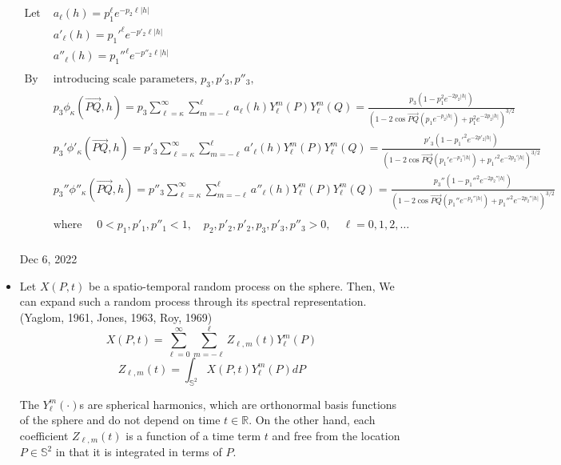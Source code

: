 \documentclass[11pt]{article}
\begin{document}
\begin{itemize}
\pagebreak

\begin{align*}
\text{Let } &a_\ell(h) = p_1^\ell e^{-p_2 \ell |h|}\\
&a'_\ell(h) = p_1'^{\ell} e^{-p'_2 \ell |h|}\\  
&a''_\ell(h) = p_1''^\ell e^{-p''_2 \ell |h|}\\
\\
\text{By } &\text{introducing scale parameters, } p_3, p'_3, p''_3,\\
& p_3 \phi_\kappa(\overrightarrow{PQ},h) = p_3 \sum_{\ell=\kappa}^{\infty} \sum_{m=-\ell}^{\ell}  a_{\ell}(h) Y_{\ell}^{m}(P) Y_{\ell}^{m}(Q) = \frac{p_3(1-p_1^2 e^{-2p_2|h|})}{(1-2 \cos{\overrightarrow{PQ}} (p_1e^{-p_2|h|}) + p_1^2 e^{-2p_2|h|})^{3/2}}\\
& p_3' \phi'_\kappa(\overrightarrow{PQ},h) = p'_3 \sum_{\ell=\kappa}^{\infty} \sum_{m=-\ell}^{\ell}  a'_{\ell}(h) Y_{\ell}^{m}(P) Y_{\ell}^{m}(Q) = \frac{{p'}_3(1-p_1'^2 e^{-2p'_2|h|})}{(1-2 \cos{\overrightarrow{PQ}} (p_1'e^{-p_2'|h|}) + p_1'^2 e^{-2p_2'|h|})^{3/2}}\\
&  p_3''\phi''_\kappa(\overrightarrow{PQ},h) = p''_3 \sum_{\ell=\kappa}^{\infty} \sum_{m=-\ell}^{\ell}  a''_{\ell}(h) Y_{\ell}^{m}(P) Y_{\ell}^{m}(Q) = \frac{p_3''(1-p_1''^2 e^{-2p_2''|h|})}{(1-2 \cos{\overrightarrow{PQ}} (p_1''e^{-p_2''|h|}) + p_1''^2 e^{-2p_2''|h|})^{3/2}}\\
\\
&\text{where } \quad 0<p_1,p'_1,p''_1<1, \quad p_2, p'_2, p'_2, p_3, p'_3, p''_3 > 0, \quad \ell=0,1,2,\dots\\
\end{align*}

\pagebreak

Dec 6, 2022

\item
Let $X(P,t)$ be a spatio-temporal random process  on the sphere. Then, We can expand such a random process through its spectral representation.(Yaglom, 1961, Jones, 1963, Roy, 1969)\\
$$ X(P,t)= \sum_{\ell=0}^{\infty}\sum_{m=-\ell}^{\ell}Z_{\ell,m}(t)Y_\ell^m(P)$$
$$Z_{\ell,m}(t)=\int_{\mathbb{S}^2} X(P,t)Y_\ell^m(P)dP$$

The $Y_\ell^m(\cdot)$s are spherical harmonics, which are orthonormal basis functions of the sphere and do not depend on time $t \in \mathbb{R}$. On the other hand, each coefficient $Z_{\ell,m}(t)$ is a function of a time term $t$ and free from the location $P \in \mathbb{S}^2$ in that it is integrated in terms of $P$. \\


\end{itemize}
\end{document}
